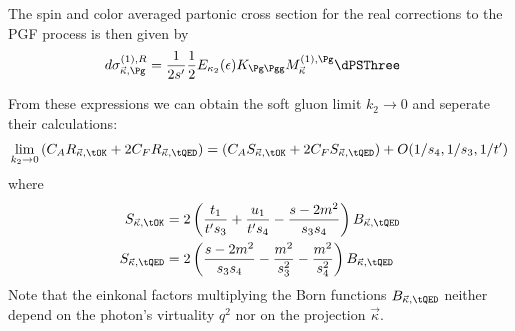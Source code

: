 The spin and color averaged partonic cross section for the real corrections to the PGF process is then given by
\begin{align}
d\sigma_{\vec \kappa,\Pg}^{(1),R} &= \frac 1 {2s'}\frac 1 2 E_{\kappa_2}(\epsilon)K_{\Pg\Pgg} M_{\vec \kappa}^{(1),\Pg} \dPSThree
\end{align}

From these expressions we can obtain the soft gluon limit $k_2\rightarrow 0$ and seperate their calculations:
\begin{equation}
\lim_{k_2\rightarrow 0}\left(C_A R_{\vec \kappa,\tOK} + 2C_F R_{\vec \kappa,\tQED}\right) = \left(C_A S_{\vec \kappa,\tOK} + 2C_F S_{\vec \kappa,\tQED}\right) + O(1/s_4,1/s_3,1/t')
\end{equation}
where
\begin{align}
S_{\vec \kappa,\tOK}  &= 2\left(\frac{t_1}{t's_3} + \frac{u_1}{t's_4}-\frac{s-2m^2}{s_3s_4}\right)B_{\vec \kappa,\tQED}\\
S_{\vec \kappa,\tQED} &= 2\left(\frac{s-2m^2}{s_3s_4} - \frac{m^2}{s_3^2} - \frac{m^2}{s_4^2}\right)B_{\vec \kappa,\tQED}
\end{align}
Note that the einkonal factors multiplying the Born functions $B_{\vec \kappa,\tQED}$ neither depend on the photon's virtuality $q^2$ nor on the projection $\vec \kappa$. 
